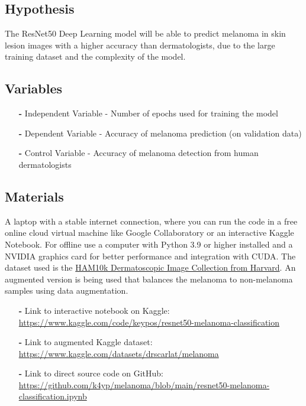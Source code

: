 \documentclass{article}
\begin{document}
\subsection{Hypothesis}
The ResNet50 Deep Learning model will be able to predict melanoma in skin lesion images with a higher accuracy than dermatologists, due to the large training dataset and the complexity of the model.

\subsection{Variables}
\begin{itemize}
\item[\textbf{-}] Independent Variable - Number of epochs used for training the model 
\item[\textbf{-}] Dependent Variable - Accuracy of melanoma prediction (on validation data)
\item[\textbf{-}] Control Variable - Accuracy of melanoma detection from human dermatologists 
\end{itemize}

\subsection{Materials}
A laptop with a stable internet connection, where you can run the code in a free online cloud  virtual machine like Google Collaboratory or an interactive Kaggle Notebook. For offline use a computer with Python 3.9 or higher installed and a NVIDIA graphics card for better performance and integration with CUDA. The dataset used is the \href{https://www.nature.com/articles/sdata2018161}{HAM10k Dermatoscopic Image Collection from Harvard}. An augmented version is being used that balances the melanoma to non-melanoma samples using data augmentation.

\begin{itemize}
\item[\textbf{-}] Link to interactive notebook on Kaggle: \href{https://www.kaggle.com/code/keypos/resnet50-melanoma-classification}{https://www.kaggle.com/code/keypos/resnet50-melanoma-classification}

\item[\textbf{-}] Link to augmented Kaggle dataset: \href{https://www.kaggle.com/datasets/drscarlat/melanoma}{https://www.kaggle.com/datasets/drscarlat/melanoma}

\item[\textbf{-}] Link to direct source code on GitHub:
\href{https://github.com/keyp0s/melanoma/blob/main/resnet50-melanoma-classification.ipynb}{https://github.com/k4yp/melanoma/blob/main/resnet50-melanoma-classification.ipynb}
\end{itemize}
\end{document}

